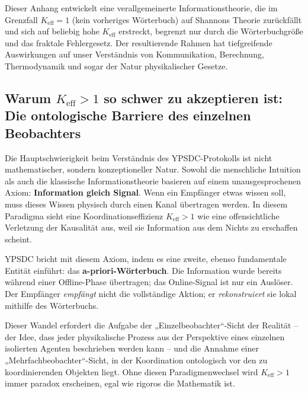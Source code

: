 \documentclass[12pt,a4paper]{article}
\theoremstyle{remark}
\newcommand{\Keff}{K_{\mathrm{eff}}}
\begin{document}
	Dieser Anhang entwickelt eine verallgemeinerte Informationstheorie, die im Grenzfall $\Keff = 1$ (kein vorheriges Wörterbuch) auf Shannons Theorie zurückfällt und sich auf beliebig hohe $\Keff$ erstreckt, begrenzt nur durch die Wörterbuchgröße und das fraktale Fehlergesetz. Der resultierende Rahmen hat tiefgreifende Auswirkungen auf unser Verständnis von Kommunikation, Berechnung, Thermodynamik und sogar der Natur physikalischer Gesetze.
	
	\subsection{Warum \(K_{\mathrm{eff}} > 1\) so schwer zu akzeptieren ist: 
		Die ontologische Barriere des einzelnen Beobachters}
	
	Die Hauptschwierigkeit beim Verständnis des YPSDC-Protokolls ist nicht mathematischer, sondern konzeptioneller Natur. Sowohl die menschliche Intuition als auch die klassische Informationstheorie basieren auf einem unausgesprochenen Axiom: \textbf{Information gleich Signal}. Wenn ein Empfänger etwas wissen soll, muss dieses Wissen physisch durch einen Kanal übertragen werden. In diesem Paradigma sieht eine Koordinationseffizienz \(K_{\mathrm{eff}} > 1\) wie eine offensichtliche Verletzung der Kausalität aus, weil sie Information aus dem Nichts zu erschaffen scheint.
	
	YPSDC bricht mit diesem Axiom, indem es eine zweite, ebenso fundamentale Entität einführt: das \textbf{a-priori-Wörterbuch}. Die Information wurde bereits während einer Offline-Phase übertragen; das Online-Signal ist nur ein Auslöser. Der Empfänger \emph{empfängt} nicht die vollständige Aktion; er \emph{rekonstruiert} sie lokal mithilfe des Wörterbuchs.
	
	Dieser Wandel erfordert die Aufgabe der „Einzelbeobachter“-Sicht der Realität – der Idee, dass jeder physikalische Prozess aus der Perspektive eines einzelnen isolierten Agenten beschrieben werden kann – und die Annahme einer „Mehrfachbeobachter“-Sicht, in der Koordination ontologisch vor den zu koordinierenden Objekten liegt. Ohne diesen Paradigmenwechsel wird \(K_{\mathrm{eff}} > 1\) immer paradox erscheinen, egal wie rigoros die Mathematik ist.
	
	\medskip
	
\end{document}
